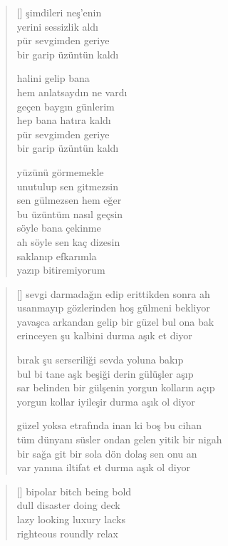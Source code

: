 \documentclass[a5paper, openright, twoside]{memoir}
\begin{document}
\begin{verse}[\versewidth]
  şimdileri neş'enin \\
  yerini sessizlik aldı \\
  pür sevgimden geriye \\
  bir garip üzüntün kaldı

  halini gelip bana \\
  hem anlatsaydın ne vardı \\
  geçen baygın günlerim \\
  hep bana hatıra kaldı \\
  pür sevgimden geriye \\
  bir garip üzüntün kaldı

  yüzünü görmemekle \\
  unutulup sen gitmezsin \\
  sen gülmezsen hem eğer \\
  bu üzüntüm nasıl geçsin \\
  söyle bana çekinme \\
  ah söyle sen kaç dizesin \\
  saklanıp efkarımla \\
  yazıp bitiremiyorum
\end{verse}
\begin{verse}[\versewidth]
  sevgi darmadağın edip erittikden sonra ah \\
  usanmayıp gözlerinden hoş gülmeni bekliyor \\
  yavaşca arkandan gelip bir güzel bul ona bak \\
  erinceyen şu kalbini durma aşık et diyor

  bırak şu serseriliği sevda yoluna bakıp \\
  bul bi tane aşk beşiği derin gülüşler aşıp \\
  sar belinden bir gülşenin yorgun kolların açıp \\
  yorgun kollar iyileşir durma aşık ol diyor

  güzel yoksa etrafında inan ki boş bu cihan \\
  tüm dünyanı süsler ondan gelen yitik bir nigah \\
  bir sağa git bir sola dön dolaş sen onu an \\
  var yanına iltifat et durma aşık ol diyor
\end{verse}
\begin{verse}[\versewidth]
  bipolar bitch being bold \\
  dull disaster doing deck \\
  lazy looking luxury lacks \\
  righteous roundly relax
\end{verse}
\end{document}
